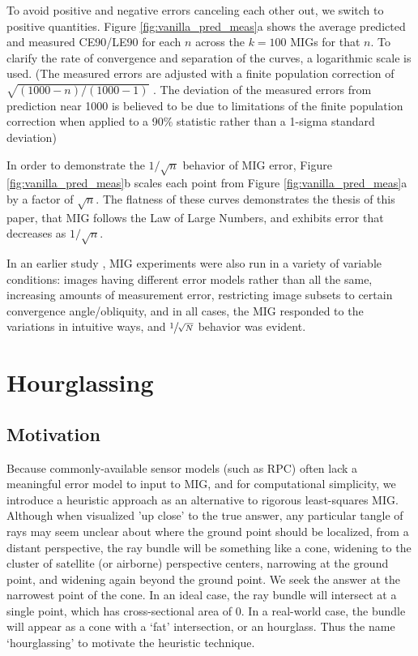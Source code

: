 \documentclass[10pt]{amsart}
\begin{document}
To avoid positive and negative errors canceling each other out, we switch to
positive quantities. Figure \ref{fig:vanilla_pred_meas}a shows the average
predicted and measured CE90/LE90 for each $n$ across the $k=100$ MIGs for that
$n$. To clarify the rate of convergence and separation of the curves, a
logarithmic scale is used. (The measured errors are adjusted with a finite
population correction of $\sqrt{(1000-n)/(1000-1)}$ \cite{FPC}. The deviation of
the measured errors from prediction near 1000 is believed to be due to
limitations of the finite population correction when applied to a 90\% statistic
rather than a 1-sigma standard deviation)

In order to demonstrate the $1/\sqrt{n}$ behavior of MIG error, Figure
\ref{fig:vanilla_pred_meas}b scales each point from Figure
\ref{fig:vanilla_pred_meas}a by a factor of $\sqrt n$. The flatness of these
curves demonstrates the thesis of this paper, that MIG follows the Law of Large
Numbers, and exhibits error that decreases as $1/\sqrt n$.

In an earlier study \cite{FRESNO}, MIG experiments were also run in a variety of
variable conditions: images having different error models rather than all the
same, increasing amounts of measurement error, restricting image subsets to
certain convergence angle/obliquity, and in all cases, the MIG responded to the
variations in intuitive ways, and $\sfrac{1}{\sqrt N}$ behavior was evident.


\section{Hourglassing\label{hourglassing}}
\subsection{Motivation}
Because commonly-available sensor models (such as RPC) often lack a meaningful
error model to input to MIG, and for computational simplicity, we introduce a
heuristic approach as an alternative to rigorous least-squares MIG. Although
when visualized 'up close' to the true answer, any particular tangle of rays may
seem unclear about where the ground point should be localized, from a distant
perspective, the ray bundle will be something like a cone, widening to the
cluster of satellite (or airborne) perspective centers, narrowing at the ground
point, and widening again beyond the ground point. We seek the answer at the
narrowest point of the cone. In an ideal case, the ray bundle will intersect at
a single point, which has cross-sectional area of 0. In a real-world case, the
bundle will appear as a cone with a `fat' intersection, or an hourglass. Thus
the name `hourglassing' to motivate the heuristic technique.
\end{document}
